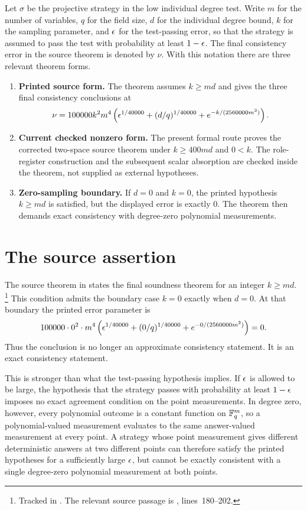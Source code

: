 \documentclass[11pt]{article}
\begin{document}
Let \(\sigma\) be the projective strategy in the low individual degree test.
Write \(m\) for the number of variables, \(q\) for the field size, \(d\) for
the individual degree bound, \(k\) for the sampling parameter, and \(\epsilon\) for
the test-passing error, so that the strategy is assumed to pass the test with
probability at least \(1-\epsilon\).  The final consistency error in the source
theorem is denoted by \(\nu\).  With this notation there are three relevant
theorem forms.
\begin{enumerate}
  \item \textbf{Printed source form.}  The theorem
   assumes \(k\ge md\) and gives the three final
  consistency conclusions at
  \[
    \nu =
    100000 k^2m^4\left(\epsilon^{1/40000}+(d/q)^{1/40000}
      + e^{-k/(2560000m^2)}\right).
  \]
  \item \textbf{Current checked nonzero form.}  The present formal route proves
  the corrected two-space source theorem under \(k\ge 400md\) and \(0<k\).  The
  role-register construction and the subsequent scalar absorption are checked
  inside the theorem, not supplied as external hypotheses.
  \item \textbf{Zero-sampling boundary.}  If \(d=0\) and \(k=0\), the printed
  hypothesis \(k\ge md\) is satisfied, but the displayed error is exactly
  \(0\).  The theorem then demands exact consistency with degree-zero
  polynomial measurements.
\end{enumerate}

\section{The source assertion}

The source theorem in \cite{Ji2020LowIndividualDegree} states the final
soundness theorem for an integer \(k\ge md\).%
\footnote{Tracked in .  The relevant source passage is
, lines~180--202.}
This condition admits the boundary case \(k=0\) exactly when \(d=0\).  At that
boundary the printed error parameter is
\[
  100000\cdot 0^2\cdot m^4
  \left(\epsilon^{1/40000}+(0/q)^{1/40000}
    + e^{-0/(2560000m^2)}\right)=0.
\]
Thus the conclusion is no longer an approximate consistency statement.  It is
an exact consistency statement.

This is stronger than what the test-passing hypothesis implies.  If
\(\epsilon\) is allowed to be large, the hypothesis that the strategy passes with
probability at least \(1-\epsilon\) imposes no exact agreement condition on the
point measurements.  In degree zero, however, every polynomial outcome is a
constant function on \(\mathbb{F}_q^m\), so a polynomial-valued measurement evaluates to
the same answer-valued measurement at every point.  A strategy whose point
measurement gives different deterministic answers at two different points can
therefore satisfy the printed hypotheses for a sufficiently large \(\epsilon\), but
cannot be exactly consistent with a single degree-zero polynomial measurement
at both points.
\end{document}
